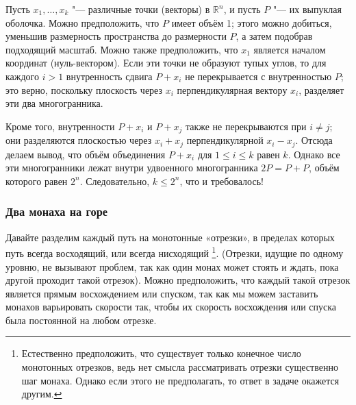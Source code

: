 \documentclass[twoside]{book}
\begin{document}
\medskip

Пусть $x_1,\dots,x_k$ "--- различные точки (векторы) в $\mathbb{R}^n$, и пусть $P$ "--- их выпуклая оболочка.
Можно предположить, что $P$ имеет объём 1;
этого можно добиться, уменьшив размерность пространства до размерности $P$, а затем подобрав подходящий масштаб.
Можно также предположить, что $x_1$ является началом координат (нуль-вектором).
Если эти точки не образуют тупых углов, то для каждого $i>1$ внутренность сдвига $P+x_i$ не перекрывается с внутренностью  $P$;
это верно, поскольку плоскость через $x_i$ перпендикулярная вектору $x_i$, разделяет эти два многогранника.

Кроме того, внутренности  $P+x_i$ и $P+x_j$ также не перекрываются при $i\ne j$;
они разделяются плоскостью через $x_i+x_j$ перпендикулярной  $x_i-x_j$.
Отсюда делаем вывод, что объём объединения $P+x_i$ для $1 \le i \le k$ равен $k$.
Однако все эти многогранники лежат внутри удвоенного многогранника $2P = P+P$, объём которого равен $2^n$. Следовательно, $k \le 2^n$, что и требовалось!
\heart



\subsubsection*{Два монаха на горе}

Давайте разделим каждый путь на монотонные «отрезки», в пределах которых путь всегда восходящий, или всегда нисходящий%
\footnote{Естественно предположить, что существует только конечное число монотонных отрезков, ведь нет смысла рассматривать отрезки\changeinner{}{,} существенно  шаг монаха.
Однако если этого не предполагать, то ответ в задаче окажется другим.
}.
(Отрезки, идущие по одному уровню, не вызывают проблем, так как один монах может стоять и ждать, пока другой проходит такой отрезок).
Можно предположить, что каждый такой отрезок является прямым восхождением или спуском, так как мы можем заставить монахов варьировать скорости так, чтобы их скорость восхождения или спуска была постоянной на любом отрезке.
\end{document}
